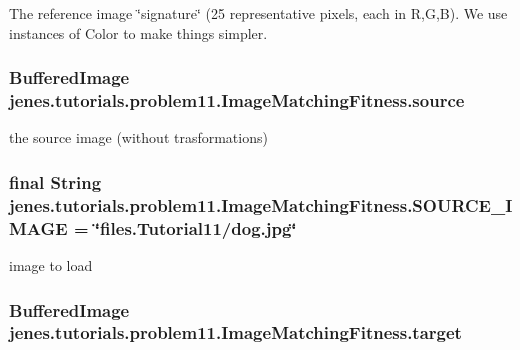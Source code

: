 The reference image \char`\"{}signature\char`\"{} (25 representative pixels, each in R,G,B). We use instances of Color to make things simpler. \hypertarget{classjenes_1_1tutorials_1_1problem11_1_1_image_matching_fitness_a43f4833e41f19eadc706b7ec449033a8}{
\subsubsection[{source}]{\setlength{\rightskip}{0pt plus 5cm}Buffered\-Image jenes.\-tutorials.\-problem11.\-Image\-Matching\-Fitness.\-source\hspace{0.3cm}{\ttfamily [private]}}}\label{classjenes_1_1tutorials_1_1problem11_1_1_image_matching_fitness_a43f4833e41f19eadc706b7ec449033a8}
the source image (without trasformations) \hypertarget{classjenes_1_1tutorials_1_1problem11_1_1_image_matching_fitness_abcca6e100ede27ef9a90ddbc35497efd}{
\subsubsection[{S\-O\-U\-R\-C\-E\-\_\-\-I\-M\-A\-G\-E}]{\setlength{\rightskip}{0pt plus 5cm}final String jenes.\-tutorials.\-problem11.\-Image\-Matching\-Fitness.\-S\-O\-U\-R\-C\-E\-\_\-\-I\-M\-A\-G\-E = \char`\"{}files.\-Tutorial11/dog.\-jpg\char`\"{}\hspace{0.3cm}{\ttfamily [static]}}}\label{classjenes_1_1tutorials_1_1problem11_1_1_image_matching_fitness_abcca6e100ede27ef9a90ddbc35497efd}
image to load \hypertarget{classjenes_1_1tutorials_1_1problem11_1_1_image_matching_fitness_a3607fd64f431452de7de69cdd659445c}{
\subsubsection[{target}]{\setlength{\rightskip}{0pt plus 5cm}Buffered\-Image jenes.\-tutorials.\-problem11.\-Image\-Matching\-Fitness.\-target\hspace{0.3cm}{\ttfamily [private]}}}\label{classjenes_1_1tutorials_1_1problem11_1_1_image_matching_fitness_a3607fd64f431452de7de69cdd659445c}
